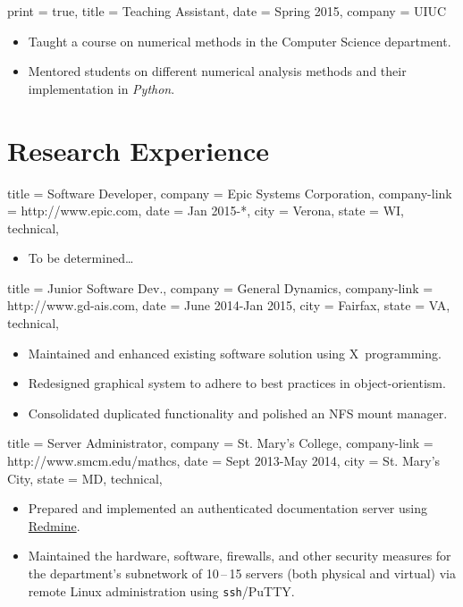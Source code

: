 \documentclass{simplecv}
\begin{document}
\begin{position}
  {
      print   = true,
      title   = Teaching Assistant,
      date    = Spring 2015,
      company = UIUC
  }

  \begin{itemize}
      \item Taught a course on numerical methods in the Computer Science department.
      \item Mentored students on different numerical analysis methods and their implementation in \textit{Python}.
  \end{itemize}
\end{position}

\section{Research Experience}

\begin{position}
  {
    title   = Software Developer,
    company = Epic Systems Corporation,
    company-link = http://www.epic.com,
    date    = Jan 2015-*,
    city    = Verona,
    state   = WI,
    technical,
  }

\begin{itemize}
\item To be determined\dots
\end{itemize}
\end{position}

\begin{position}
  {
    title   = Junior Software Dev.,
    company = General Dynamics,
    company-link = http://www.gd-ais.com,
    date    = June 2014-Jan 2015,
    city    = Fairfax,
    state   = VA,
    technical,
  }

\begin{itemize}
\item Maintained and enhanced existing software solution using X~programming.
\item Redesigned graphical system to adhere to best practices in object-orientism.
\item Consolidated duplicated functionality and polished an NFS mount manager.
\end{itemize}
\end{position}

\begin{position}
  {
    title   = Server Administrator,
    company = St. Mary's College,
    company-link = http://www.smcm.edu/mathcs,
    date    = Sept 2013-May 2014,
    city    = St. Mary's City,
    state   = MD,
    technical,
  }

\begin{itemize}
\item Prepared and implemented an authenticated documentation server using \href{http://www.redmine.org}{Redmine}.
\item Maintained the hardware, software, firewalls, and other security measures
  for the department's subnetwork of 10\,--\,15 servers (both physical and virtual) via remote Linux administration using \texttt{ssh}\slash PuTTY.
\end{itemize}
\end{position}
\end{document}
